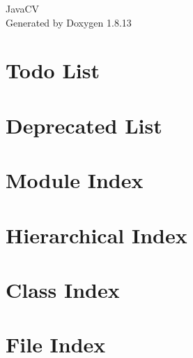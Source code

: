 \documentclass[twoside]{book}
\newcommand{\+}{\discretionary{\mbox{\scriptsize$\hookleftarrow$}}{}{}}
\newcommand{\clearemptydoublepage}{%
  \newpage{\pagestyle{empty}\cleardoublepage}%
}
\begin{document}
\hypersetup{pageanchor=false,
             bookmarksnumbered=true,
             pdfencoding=unicode
            }
\begin{titlepage}
\vspace*{7cm}
\begin{center}%
{\Large Java\+CV }\\
\vspace*{1cm}
{\large Generated by Doxygen 1.8.13}\\
\end{center}
\end{titlepage}
\clearemptydoublepage
{}
\tableofcontents
\clearemptydoublepage
{}
\hypersetup{pageanchor=true}

\chapter{Todo List}
\label{todo}

\chapter{Deprecated List}
\label{deprecated}

\chapter{Module Index}

\chapter{Hierarchical Index}

\chapter{Class Index}

\chapter{File Index}

\end{document}

